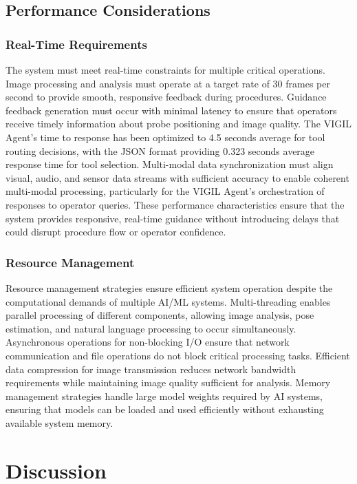 \documentclass[12pt,a4paper]{article}
\begin{document}
\subsection{Performance Considerations}

\subsubsection{Real-Time Requirements}

The system must meet real-time constraints for multiple critical operations. Image processing and analysis must operate at a target rate of 30 frames per second to provide smooth, responsive feedback during procedures. Guidance feedback generation must occur with minimal latency to ensure that operators receive timely information about probe positioning and image quality. The VIGIL Agent's time to response has been optimized to 4.5 seconds average for tool routing decisions, with the JSON format providing 0.323 seconds average response time for tool selection. Multi-modal data synchronization must align visual, audio, and sensor data streams with sufficient accuracy to enable coherent multi-modal processing, particularly for the VIGIL Agent's orchestration of responses to operator queries. These performance characteristics ensure that the system provides responsive, real-time guidance without introducing delays that could disrupt procedure flow or operator confidence.

\subsubsection{Resource Management}

Resource management strategies ensure efficient system operation despite the computational demands of multiple AI/ML systems. Multi-threading enables parallel processing of different components, allowing image analysis, pose estimation, and natural language processing to occur simultaneously. Asynchronous operations for non-blocking I/O ensure that network communication and file operations do not block critical processing tasks. Efficient data compression for image transmission reduces network bandwidth requirements while maintaining image quality sufficient for analysis. Memory management strategies handle large model weights required by AI systems, ensuring that models can be loaded and used efficiently without exhausting available system memory.

\section{Discussion}
\end{document}
